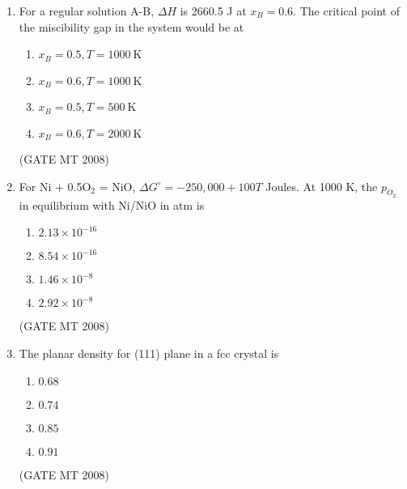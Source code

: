 \documentclass[11pt, letterpaper]{article}
\theoremstyle{remark}
\begin{document}
\begin{enumerate}[label=Q.\arabic*]
\item For a regular solution A-B, $\Delta H$ is 2660.5 J at $x_B = 0.6$. The critical point of the miscibility gap in the system would be at
    \vspace{-0.9em}
    \begin{multicols}{2}
        \begin{enumerate}[label=(\MakeUppercase{\alph*})]
            \item $x_B = 0.5, T = 1000 \ \mathrm{K}$
            \item $x_B = 0.6, T = 1000 \ \mathrm{K}$
            \item $x_B = 0.5, T = 500 \ \mathrm{K}$
            \item $x_B = 0.6, T = 2000 \ \mathrm{K}$
        \end{enumerate}
    \end{multicols}
    \vspace{-5mm}
   \hfill(GATE MT 2008) 
\item For Ni + 0.5O$_2$ = NiO, $\Delta G^\circ = -250,000 + 100T$ Joules. At 1000 K, the $p_{O_2}$ in equilibrium with Ni/NiO in atm is 
    \vspace{-0.9em}
    \begin{multicols}{4}
        \begin{enumerate}[label=(\MakeUppercase{\alph*})]
            \item $2.13 \times 10^{-16}$
            \item $8.54 \times 10^{-16}$
            \item $1.46 \times 10^{-8}$
            \item $2.92 \times 10^{-8}$
        \end{enumerate}
    \end{multicols}
    \vspace{-5mm}
   \hfill(GATE MT 2008) 
\item The planar density for (111) plane in a fcc crystal is 
    \vspace{-0.9em}
    \begin{multicols}{4}
        \begin{enumerate}[label=(\MakeUppercase{\alph*})]
            \item $0.68$
            \item $0.74$ 
            \item $0.85$ 
            \item $0.91$
        \end{enumerate}
    \end{multicols}
    \vspace{-5mm}
\hfill(GATE MT 2008)
   

\end{enumerate}
\end{document}
